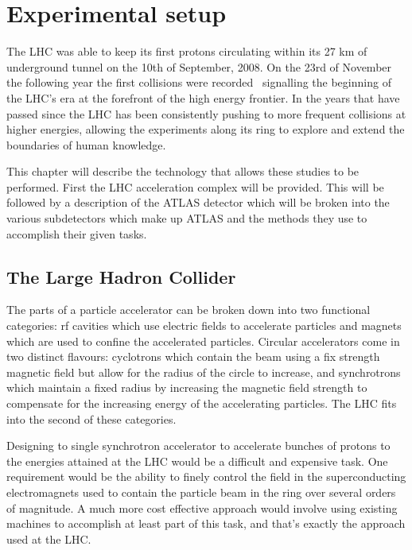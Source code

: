 \chapter{Experimental setup}
\label{Experiment}
The \gls{LHC} was able to keep its first protons circulating within its 27 km of underground tunnel on the 10th of September, 2008.  
On the 23rd of November the following year the first collisions were recorded~\cite{FirstCollisions} signalling the beginning of the LHC's era at the forefront of the high energy frontier.  
In the years that have passed since the LHC has been consistently pushing to more frequent collisions at higher energies, allowing the experiments along its ring to explore and extend the boundaries of human knowledge.  

This chapter will describe the technology that allows these studies to be performed.  
First the LHC acceleration complex will be provided.  
This will be followed by a description of the ATLAS detector which will be broken into the various subdetectors which make up ATLAS and the methods they use to accomplish their given tasks.   

\section{The Large Hadron Collider}
\label{Sec:LHC}

The parts of a particle accelerator can be broken down into two functional categories: rf cavities which use electric fields to accelerate particles and magnets which are used to confine the accelerated particles.  
Circular accelerators come in two distinct flavours: cyclotrons which contain the beam using a fix strength magnetic field but allow for the radius of the circle to increase, and synchrotrons which maintain a fixed radius by increasing the magnetic field strength to compensate for the increasing energy of the accelerating particles.  
The LHC fits into the second of these categories.  

Designing to single synchrotron accelerator to accelerate bunches of protons to the energies attained at the LHC would be a difficult and expensive task.
One requirement would be the ability to finely control the field in the superconducting electromagnets used to contain the particle beam in the ring over several orders of magnitude.  
A much more cost effective approach would involve using existing machines to accomplish at least part of this task, and that's exactly the approach used at the LHC.  

